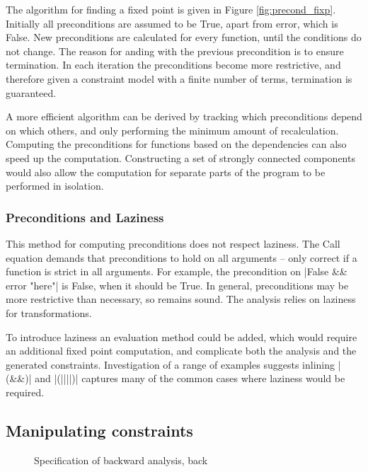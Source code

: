 \documentclass[preprint]{sigplanconf}
\newcommand{\C}[1]{\textsf{#1}}
\begin{document}
The algorithm for finding a fixed point is given in Figure \ref{fig:precond_fixp}. Initially all preconditions are assumed to be True, apart from \C{error}, which is False. New preconditions are calculated for every function, until the conditions do not change. The reason for anding with the previous precondition is to ensure termination. In each iteration the preconditions become more restrictive, and therefore given a constraint model with a finite number of terms, termination is guaranteed.

A more efficient algorithm can be derived by tracking which preconditions depend on which others, and only performing the minimum amount of recalculation. Computing the preconditions for functions based on the dependencies can also speed up the computation. Constructing a set of strongly connected components would also allow the computation for separate parts of the program to be performed in isolation.

\subsubsection{Preconditions and Laziness}

This method for computing preconditions does not respect laziness. The \C{Call} equation demands that preconditions to hold on all arguments -- only correct if a function is strict in all arguments. For example, the precondition on |False && error "here"| is False, when it should be True. In general, preconditions may be more restrictive than necessary, so remains sound. The analysis relies on laziness for transformations.

To introduce laziness an evaluation method could be added, which would require an additional fixed point computation, and complicate both the analysis and the generated constraints. Investigation of a range of examples suggests inlining |(&&)| and |(||||)| captures many of the common cases where laziness would be required.


\subsection{Manipulating constraints}
\label{sec:backward}

\begin{figure}
\caption{Specification of backward analysis, \C{back}}
\label{fig:backward}
\end{figure}
\end{document}
